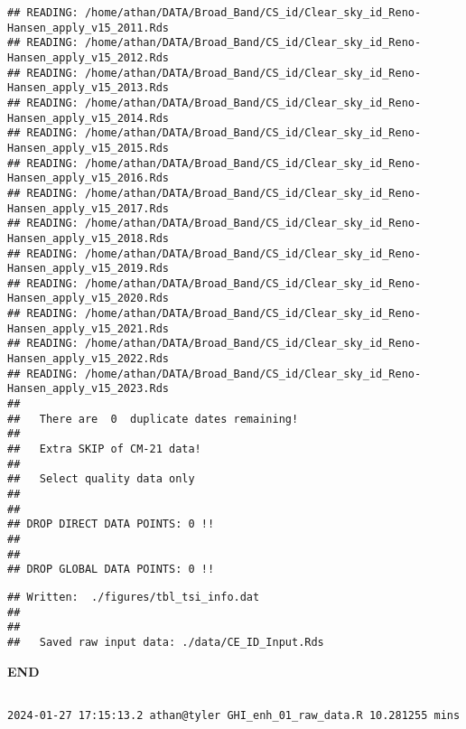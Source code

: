 \documentclass[
  10pt,
  a4paper,oneside]{article}
\begin{document}
\begin{verbatim}
## READING: /home/athan/DATA/Broad_Band/CS_id/Clear_sky_id_Reno-Hansen_apply_v15_2011.Rds 
## READING: /home/athan/DATA/Broad_Band/CS_id/Clear_sky_id_Reno-Hansen_apply_v15_2012.Rds 
## READING: /home/athan/DATA/Broad_Band/CS_id/Clear_sky_id_Reno-Hansen_apply_v15_2013.Rds 
## READING: /home/athan/DATA/Broad_Band/CS_id/Clear_sky_id_Reno-Hansen_apply_v15_2014.Rds 
## READING: /home/athan/DATA/Broad_Band/CS_id/Clear_sky_id_Reno-Hansen_apply_v15_2015.Rds 
## READING: /home/athan/DATA/Broad_Band/CS_id/Clear_sky_id_Reno-Hansen_apply_v15_2016.Rds 
## READING: /home/athan/DATA/Broad_Band/CS_id/Clear_sky_id_Reno-Hansen_apply_v15_2017.Rds 
## READING: /home/athan/DATA/Broad_Band/CS_id/Clear_sky_id_Reno-Hansen_apply_v15_2018.Rds 
## READING: /home/athan/DATA/Broad_Band/CS_id/Clear_sky_id_Reno-Hansen_apply_v15_2019.Rds 
## READING: /home/athan/DATA/Broad_Band/CS_id/Clear_sky_id_Reno-Hansen_apply_v15_2020.Rds 
## READING: /home/athan/DATA/Broad_Band/CS_id/Clear_sky_id_Reno-Hansen_apply_v15_2021.Rds 
## READING: /home/athan/DATA/Broad_Band/CS_id/Clear_sky_id_Reno-Hansen_apply_v15_2022.Rds 
## READING: /home/athan/DATA/Broad_Band/CS_id/Clear_sky_id_Reno-Hansen_apply_v15_2023.Rds 
## 
##   There are  0  duplicate dates remaining!
## 
##   Extra SKIP of CM-21 data!
## 
##   Select quality data only
## 
## 
## DROP DIRECT DATA POINTS: 0 !!
## 
## 
## DROP GLOBAL DATA POINTS: 0 !!
\end{verbatim}

\begin{verbatim}
## Written:  ./figures/tbl_tsi_info.dat 
## 
## 
##   Saved raw input data: ./data/CE_ID_Input.Rds
\end{verbatim}

\textbf{END}

\begin{verbatim}

2024-01-27 17:15:13.2 athan@tyler GHI_enh_01_raw_data.R 10.281255 mins
\end{verbatim}
\end{document}
